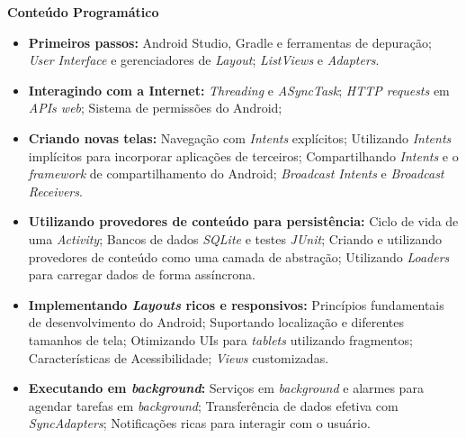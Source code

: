 
\begin{snugshade}\begin{center}\textbf{
    Conteúdo Programático
}\end{center}\end{snugshade}

\begin{itemize}

\item \textbf{Primeiros passos:}
    Android Studio, Gradle e ferramentas de depuração;
    \textit{User Interface} e gerenciadores de \textit{Layout};
    \textit{ListViews} e \textit{Adapters}.

\item \textbf{Interagindo com a Internet:}
    \textit{Threading} e \textit{ASyncTask};
    \textit{HTTP requests} em \textit{APIs web};
    Sistema de permissões do Android;

\item \textbf{Criando novas telas:}
    Navegação com \textit{Intents} explícitos;
    Utilizando \textit{Intents} implícitos para incorporar aplicações de terceiros;
    Compartilhando \textit{Intents} e o \textit{framework} de compartilhamento do Android;
    \textit{Broadcast Intents} e  \textit{Broadcast Receivers}.

\item \textbf{Utilizando provedores de conteúdo para persistência:}
    Ciclo de vida de uma \textit{Activity};
    Bancos de dados \textit{SQLite} e testes \textit{JUnit};
    Criando e utilizando provedores de conteúdo como uma camada de abstração;
    Utilizando \textit{Loaders} para carregar dados de forma assíncrona.
    

\item \textbf{Implementando \textit{Layouts} ricos e responsivos:}
    Princípios fundamentais de desenvolvimento do Android;
    Suportando localização e diferentes tamanhos de tela;
    Otimizando UIs para \textit{tablets} utilizando fragmentos;
    Características de Acessibilidade;
    \textit{Views} customizadas.

\item \textbf{Executando em \textit{background}:}
    Serviços em \textit{background} e alarmes para agendar tarefas em \textit{background};
    Transferência de dados efetiva com \textit{SyncAdapters};
    Notificações ricas para interagir com o usuário.

\end{itemize}

